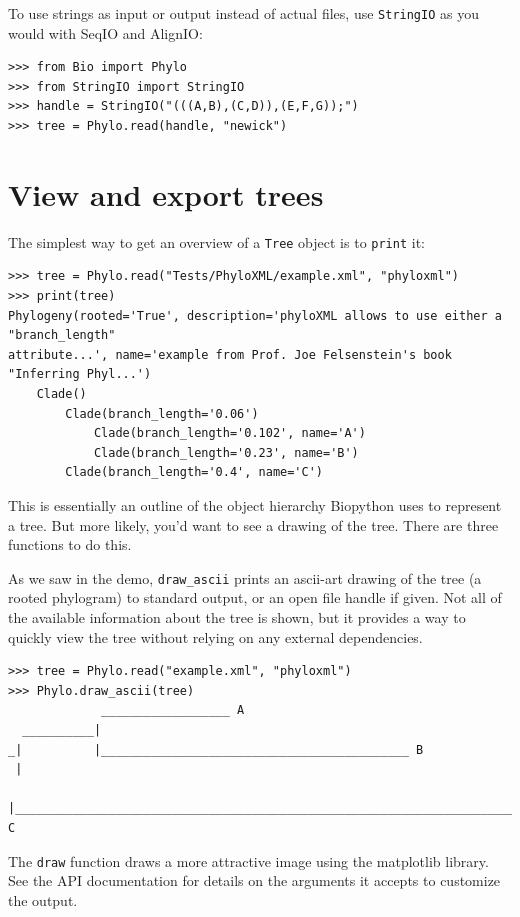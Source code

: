\documentclass{report}
\begin{document}
To use strings as input or output instead of actual files, use \verb|StringIO| as you would
with SeqIO and AlignIO:

\begin{verbatim}
>>> from Bio import Phylo
>>> from StringIO import StringIO
>>> handle = StringIO("(((A,B),(C,D)),(E,F,G));")
>>> tree = Phylo.read(handle, "newick")
\end{verbatim}


\section{View and export trees}

The simplest way to get an overview of a \verb|Tree| object is to \verb|print| it:

\begin{verbatim}
>>> tree = Phylo.read("Tests/PhyloXML/example.xml", "phyloxml")
>>> print(tree)
Phylogeny(rooted='True', description='phyloXML allows to use either a "branch_length"
attribute...', name='example from Prof. Joe Felsenstein's book "Inferring Phyl...')
    Clade()
        Clade(branch_length='0.06')
            Clade(branch_length='0.102', name='A')
            Clade(branch_length='0.23', name='B')
        Clade(branch_length='0.4', name='C')
\end{verbatim}

This is essentially an outline of the object hierarchy Biopython uses to represent a tree. But
more likely, you'd want to see a drawing of the tree. There are three functions to do this.

As we saw in the demo, \verb|draw_ascii| prints an ascii-art drawing of the tree (a
rooted phylogram) to standard output, or an open file handle if given. Not all of the
available information about the tree is shown, but it provides a way to quickly view the
tree without relying on any external dependencies.

\begin{verbatim}
>>> tree = Phylo.read("example.xml", "phyloxml")
>>> Phylo.draw_ascii(tree)
             __________________ A
  __________|
_|          |___________________________________________ B
 |
 |___________________________________________________________________________ C

\end{verbatim}

The \verb|draw| function draws a more attractive image using the matplotlib
library. See the API documentation for details on the arguments it accepts to
customize the output.
\end{document}
